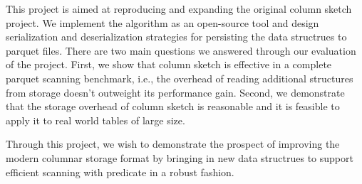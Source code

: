 This project is aimed at reproducing and expanding the original column sketch project.
We implement the algorithm as an open-source tool and design serialization and deserialization strategies for persisting the data structrues to parquet files.
There are two main questions we answered through our evaluation of the project.
First, we show that column sketch is effective in a complete parquet scanning benchmark, i.e., the overhead of reading additional structures from storage doesn't outweight its performance gain.
Second, we demonstrate that the storage overhead of column sketch is reasonable and it is feasible to apply it to real world tables of large size.

Through this project, we wish to demonstrate the prospect of improving the modern columnar storage format by bringing in new data structrues to support efficient scanning with predicate in a robust fashion.